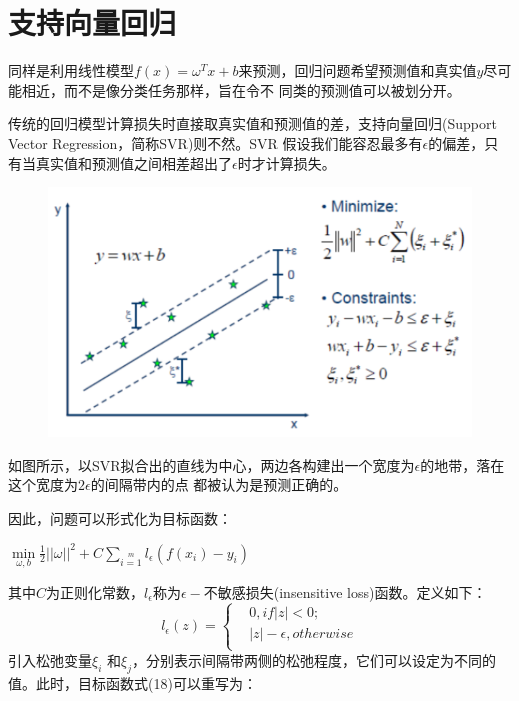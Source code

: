 \documentclass[UTF8]{ctexart}
\begin{document}
{\section{支持向量回归}
同样是利用线性模型$f(x)=\omega^Tx+b$来预测，回归问题希望预测值和真实值$y$尽可能相近，而不是像分类任务那样，旨在令不
同类的预测值可以被划分开。\par
传统的回归模型计算损失时直接取真实值和预测值的差，支持向量回归(Support Vector Regression，简称SVR)则不然。SVR
假设我们能容忍最多有$\epsilon$的偏差，只有当真实值和预测值之间相差超出了$\epsilon$时才计算损失。\par
\begin{figure}[ht]
    \centering
    \includegraphics[scale=0.5]{08.PNG}    
\end{figure}\par
如图所示，以SVR拟合出的直线为中心，两边各构建出一个宽度为$\epsilon$的地带，落在这个宽度为$2\epsilon$的间隔带内的点
都被认为是预测正确的。\par
因此，问题可以形式化为目标函数：\par
\begin{center}
    \Large{
        $\min\limits_{\omega,b}\frac{1}{2}||\omega||^2+C\sum\limits_{i=1}\limits^ml_{\epsilon}(f(x_i)-y_i)$
    }
\end{center}
其中$C$为正则化常数，$l_{\epsilon}$称为$\epsilon-$不敏感损失(insensitive loss)函数。定义如下：
$$l_{\epsilon}(z)=\left\{
    \begin{aligned}
    &0,if|z|<0;\\
    &|z|-\epsilon,otherwise\\
    \end{aligned}
\right.
$$
引入松弛变量$\xi_i$
和$\xi_j$，分别表示间隔带两侧的松弛程度，它们可以设定为不同的值。此时，目标函数式(18)可以重写为：
\begin{center}

\end{center}}
\end{document}
